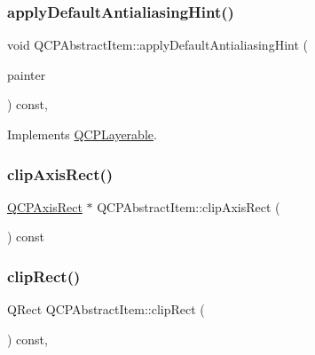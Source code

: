 \subsubsection{\texorpdfstring{applyDefaultAntialiasingHint()}{applyDefaultAntialiasingHint()}}
{\footnotesize\ttfamily void Q\+C\+P\+Abstract\+Item\+::apply\+Default\+Antialiasing\+Hint (\begin{DoxyParamCaption}\item[{\mbox{\hyperlink{class_q_c_p_painter}{Q\+C\+P\+Painter}} $\ast$}]{painter }\end{DoxyParamCaption}) const\hspace{0.3cm}{\ttfamily [protected]}, {\ttfamily [virtual]}}



Implements \mbox{\hyperlink{class_q_c_p_layerable_afdf83ddc6a265cbf4c89fe99d3d93473}{Q\+C\+P\+Layerable}}.

\mbox{\label{class_q_c_p_abstract_item_ae162314efd3fe1a6d4df11da1d275d52}} 
\subsubsection{\texorpdfstring{clipAxisRect()}{clipAxisRect()}}
{\footnotesize\ttfamily \mbox{\hyperlink{class_q_c_p_axis_rect}{Q\+C\+P\+Axis\+Rect}} $\ast$ Q\+C\+P\+Abstract\+Item\+::clip\+Axis\+Rect (\begin{DoxyParamCaption}{ }\end{DoxyParamCaption}) const}

\mbox{\label{class_q_c_p_abstract_item_a6ad60000f29afe11035e1f791dcbd45a}} 
\subsubsection{\texorpdfstring{clipRect()}{clipRect()}}
{\footnotesize\ttfamily Q\+Rect Q\+C\+P\+Abstract\+Item\+::clip\+Rect (\begin{DoxyParamCaption}{ }\end{DoxyParamCaption}) const\hspace{0.3cm}{\ttfamily [protected]}, {\ttfamily [virtual]}}



